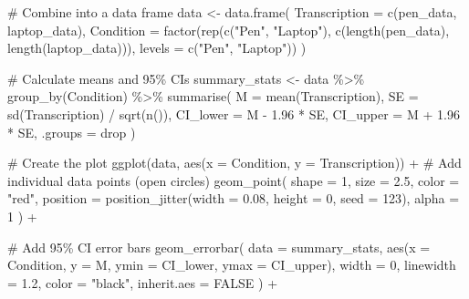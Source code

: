 \documentclass[
  letterpaper,
  DIV=11,
  numbers=noendperiod]{scrreprt}
\newenvironment{Shaded}{\begin{snugshade}}{\end{snugshade}}
\newcommand{\AttributeTok}[1]{\textcolor[rgb]{0.40,0.45,0.13}{#1}}
\newcommand{\CommentTok}[1]{\textcolor[rgb]{0.37,0.37,0.37}{#1}}
\newcommand{\ConstantTok}[1]{\textcolor[rgb]{0.56,0.35,0.01}{#1}}
\newcommand{\DecValTok}[1]{\textcolor[rgb]{0.68,0.00,0.00}{#1}}
\newcommand{\FloatTok}[1]{\textcolor[rgb]{0.68,0.00,0.00}{#1}}
\newcommand{\FunctionTok}[1]{\textcolor[rgb]{0.28,0.35,0.67}{#1}}
\newcommand{\NormalTok}[1]{\textcolor[rgb]{0.00,0.23,0.31}{#1}}
\newcommand{\OtherTok}[1]{\textcolor[rgb]{0.00,0.23,0.31}{#1}}
\newcommand{\SpecialCharTok}[1]{\textcolor[rgb]{0.37,0.37,0.37}{#1}}
\newcommand{\StringTok}[1]{\textcolor[rgb]{0.13,0.47,0.30}{#1}}
\begin{document}
\begin{Shaded}
\begin{Highlighting}[]
\CommentTok{\# Combine into a data frame}
\NormalTok{data }\OtherTok{\textless{}{-}} \FunctionTok{data.frame}\NormalTok{(}
  \AttributeTok{Transcription =} \FunctionTok{c}\NormalTok{(pen\_data, laptop\_data),}
  \AttributeTok{Condition =} \FunctionTok{factor}\NormalTok{(}\FunctionTok{rep}\NormalTok{(}\FunctionTok{c}\NormalTok{(}\StringTok{"Pen"}\NormalTok{, }\StringTok{"Laptop"}\NormalTok{), }\FunctionTok{c}\NormalTok{(}\FunctionTok{length}\NormalTok{(pen\_data), }\FunctionTok{length}\NormalTok{(laptop\_data))),}
                     \AttributeTok{levels =} \FunctionTok{c}\NormalTok{(}\StringTok{"Pen"}\NormalTok{, }\StringTok{"Laptop"}\NormalTok{))}
\NormalTok{)}

\CommentTok{\# Calculate means and 95\% CIs}
\NormalTok{summary\_stats }\OtherTok{\textless{}{-}}\NormalTok{ data }\SpecialCharTok{\%\textgreater{}\%}
  \FunctionTok{group\_by}\NormalTok{(Condition) }\SpecialCharTok{\%\textgreater{}\%}
  \FunctionTok{summarise}\NormalTok{(}
    \AttributeTok{M =} \FunctionTok{mean}\NormalTok{(Transcription),}
    \AttributeTok{SE =} \FunctionTok{sd}\NormalTok{(Transcription) }\SpecialCharTok{/} \FunctionTok{sqrt}\NormalTok{(}\FunctionTok{n}\NormalTok{()),}
    \AttributeTok{CI\_lower =}\NormalTok{ M }\SpecialCharTok{{-}} \FloatTok{1.96} \SpecialCharTok{*}\NormalTok{ SE,}
    \AttributeTok{CI\_upper =}\NormalTok{ M }\SpecialCharTok{+} \FloatTok{1.96} \SpecialCharTok{*}\NormalTok{ SE,}
    \AttributeTok{.groups =} \StringTok{\textquotesingle{}drop\textquotesingle{}}
\NormalTok{  )}

\CommentTok{\# Create the plot}
\FunctionTok{ggplot}\NormalTok{(data, }\FunctionTok{aes}\NormalTok{(}\AttributeTok{x =}\NormalTok{ Condition, }\AttributeTok{y =}\NormalTok{ Transcription)) }\SpecialCharTok{+}
  \CommentTok{\# Add individual data points (open circles)}
  \FunctionTok{geom\_point}\NormalTok{(}
    \AttributeTok{shape =} \DecValTok{1}\NormalTok{, }
    \AttributeTok{size =} \FloatTok{2.5}\NormalTok{, }
    \AttributeTok{color =} \StringTok{"red"}\NormalTok{, }
    \AttributeTok{position =} \FunctionTok{position\_jitter}\NormalTok{(}\AttributeTok{width =} \FloatTok{0.08}\NormalTok{, }\AttributeTok{height =} \DecValTok{0}\NormalTok{, }\AttributeTok{seed =} \DecValTok{123}\NormalTok{),}
    \AttributeTok{alpha =} \DecValTok{1}
\NormalTok{  ) }\SpecialCharTok{+}
  
  \CommentTok{\# Add 95\% CI error bars}
  \FunctionTok{geom\_errorbar}\NormalTok{(}
    \AttributeTok{data =}\NormalTok{ summary\_stats,}
    \FunctionTok{aes}\NormalTok{(}\AttributeTok{x =}\NormalTok{ Condition, }\AttributeTok{y =}\NormalTok{ M, }\AttributeTok{ymin =}\NormalTok{ CI\_lower, }\AttributeTok{ymax =}\NormalTok{ CI\_upper),}
    \AttributeTok{width =} \DecValTok{0}\NormalTok{, }
    \AttributeTok{linewidth =} \FloatTok{1.2}\NormalTok{, }
    \AttributeTok{color =} \StringTok{"black"}\NormalTok{,}
    \AttributeTok{inherit.aes =} \ConstantTok{FALSE}
\NormalTok{  ) }\SpecialCharTok{+}
  

\end{Highlighting}
\end{Shaded}
\end{document}
